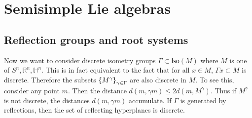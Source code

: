 \documentclass[leqno, openany]{memoir}
\theoremstyle{definition}
\theoremstyle{remark}
\theoremstyle{plain}
\theoremstyle{definition}
\theoremstyle{remark}
\newcommand{\R}{\mathbb{R}}
\renewcommand{\H}{\mathbb{H}}
\begin{document}
\chapter{Semisimple Lie algebras}%

\section{Reflection groups and root systems}%

Now we want to consider discrete isometry groups $\Gamma \subset
\mathsf{Iso}(M)$ where $M$ is one of $S^n, \R^n, \H^n$. This is in fact
equivalent to the fact that for all $x \in M$, $\Gamma x \subset M$ is
discrete. Therefore the subsets $\qty{M^{\gamma}}_{\gamma \in \Gamma}$ are also
discrete in $M$. To see this, consider any point $m$. Then the distance $d(m,
\gamma m) \leq 2 d(m, M^{\gamma})$. Thus if $M^{\gamma}$ is not discrete, the
distances $d(m, \gamma m)$ accumulate. If $\Gamma$ is generated by reflections,
then the set of reflecting hyperplanes is discrete.
\end{document}
